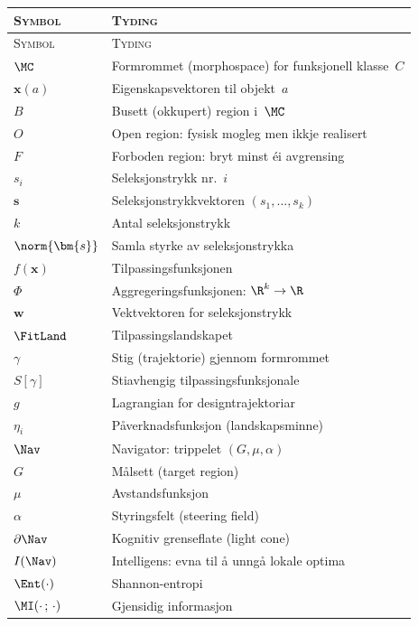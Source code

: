 {\small
\begin{longtable}{@{}p{28mm}p{62mm}@{}}
\toprule
\textsc{Symbol} & \textsc{Tyding} \\
\midrule
\endfirsthead
\toprule
\textsc{Symbol} & \textsc{Tyding} \\
\midrule
\endhead
\bottomrule
\endfoot

$\MC$ & Formrommet (morphospace) for funksjonell klasse~$C$ \\
$\bm{x}(a)$ & Eigenskapsvektoren til objekt~$a$ \\
$B$ & Busett (okkupert) region i~$\MC$ \\
$O$ & Open region: fysisk mogleg men ikkje realisert \\
$F$ & Forboden region: bryt minst éi avgrensing \\
\addlinespace
$s_i$ & Seleksjonstrykk nr.~$i$ \\
$\bm{s}$ & Seleksjonstrykkvektoren $(s_1, \ldots, s_k)$ \\
$k$ & Antal seleksjonstrykk \\
$\norm{\bm{s}}$ & Samla styrke av seleksjonstrykka \\
\addlinespace
$f(\bm{x})$ & Tilpassingsfunksjonen \\
$\Phi$ & Aggregeringsfunksjonen: $\R^k \to \R$ \\
$\bm{w}$ & Vektvektoren for seleksjonstrykk \\
$\FitLand$ & Tilpassingslandskapet \\
\addlinespace
$\gamma$ & Stig (trajektorie) gjennom formrommet \\
$S[\gamma]$ & Stiavhengig tilpassingsfunksjonale \\
$g$ & Lagrangian for designtrajektoriar \\
$\eta_i$ & Påverknadsfunksjon (landskapsminne) \\
\addlinespace
$\Nav$ & Navigator: trippelet $(G, \mu, \alpha)$ \\
$G$ & Målsett (target region) \\
$\mu$ & Avstandsfunksjon \\
$\alpha$ & Styringsfelt (steering field) \\
$\partial \Nav$ & Kognitiv grenseflate (light cone) \\
$I(\Nav)$ & Intelligens: evna til å unngå lokale optima \\
\addlinespace
$\Ent(\cdot)$ & Shannon-entropi \\
$\MI(\cdot\,;\,\cdot)$ & Gjensidig informasjon \\

\end{longtable}}
